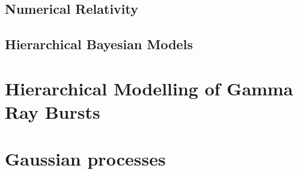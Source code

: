 \documentclass{kentigern}
\theoremstyle{definition}
\begin{document}

\section{Numerical Relativity}
\label{sec:numerical-relativity}


\section{Hierarchical Bayesian Models}
\label{sec:hierarchical-models}

\chapter{Hierarchical Modelling of Gamma Ray Bursts}
\label{cha:gamma-ray-burst}

\chapter{Gaussian processes}
\label{cha:gaussian-process}
\chapterprecis{}




\appendices







\glsaddall
\printglossaries
\end{document}
